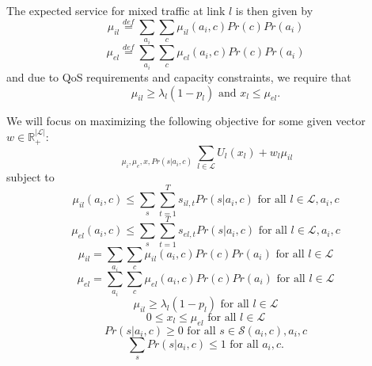 \documentclass[conference]{IEEEtran}
\begin{document}
The expected service for mixed traffic at link $l$ is then given by
\begin{equation*}
	\mu_{il} \stackrel{def}{=} \sum\limits_{a_i} \sum\limits_{c} \mu_{il}(a_i,c) Pr(c) Pr(a_i)
\end{equation*}
\begin{equation*}
	\mu_{el} \stackrel{def}{=} \sum\limits_{a_i} \sum\limits_{c} \mu_{el}(a_i,c) Pr(c) Pr(a_i)
\end{equation*}
and due to QoS requirements and capacity constraints, we require that
\begin{equation*}
	\mu_{il} \geq \lambda_l(1-p_l) \mbox{ and } x_l \leq \mu_{el}.
\end{equation*}

We will focus on maximizing the following objective for some given vector $w \in \mathbb{R}_+^{|\mathcal{L}|}$:
\begin{equation}
\label{offline_opt_kc}
	\mathop{ \max\limits_{ \mu_{i}(a_i,c), \mu_{e}(a_i,c), } }\limits_{ \mu_{i}, \mu_{e}, x, Pr(s | a_i, c) } \sum\limits_{l \in \mathcal{L}} U_l(x_l) + w_l \mu_{il}
\end{equation}
subject to
\begin{equation*}
 \mu_{il}(a_i,c) \leq \sum\limits_{s} \sum_{t=1}^{T} s_{il,t} Pr(s | a_i, c) \mbox{ for all } l \in \mathcal{L}, a_i, c
\end{equation*}
\begin{equation*}
 \mu_{el}(a_i,c) \leq \sum\limits_{s} \sum_{t=1}^{T} s_{el,t} Pr(s | a_i, c) \mbox{ for all } l \in \mathcal{L}, a_i, c
\end{equation*}
\begin{equation*}
	\mu_{il} = \sum\limits_{a_i} \sum\limits_{c} \mu_{il}(a_i,c) Pr(c) Pr(a_i) \mbox{ for all } l \in \mathcal{L}
\end{equation*}
\begin{equation*}
	\mu_{el} = \sum\limits_{a_i} \sum\limits_{c} \mu_{el}(a_i,c) Pr(c) Pr(a_i) \mbox{ for all } l \in \mathcal{L}
\end{equation*}
\begin{equation*}
	\mu_{il} \geq \lambda_l(1-p_l) \mbox{ for all } l \in \mathcal{L}
\end{equation*}
\begin{equation*}
	0 \leq x_l \leq \mu_{el} \mbox{ for all } l \in \mathcal{L}
\end{equation*}
\begin{equation*}
	Pr(s | a_i, c) \geq 0 \mbox{ for all } s \in \mathcal{S}(a_i, c), a_i, c
\end{equation*}
\begin{equation*}
	\sum_{s} Pr(s | a_i, c) \leq 1 \mbox{ for all } a_i, c.
\end{equation*}
\end{document}
